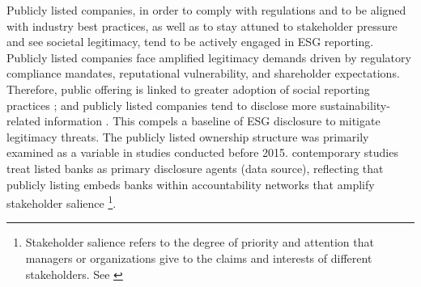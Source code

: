 \documentclass[
  authoryear]{elsarticle}
\begin{document}
Publicly listed companies, in order to comply with regulations and to be
aligned with industry best practices, as well as to stay attuned to
stakeholder pressure and see societal legitimacy, tend to be actively
engaged in ESG reporting. Publicly listed companies face amplified
legitimacy demands driven by regulatory compliance mandates,
reputational vulnerability, and shareholder expectations. Therefore,
public offering is linked to greater adoption of social reporting
practices \citep{HADDOCK2005}; and publicly listed companies tend to
disclose more sustainability-related information
\citep{GAMERSCHLAG2011}. This compels a baseline of ESG disclosure to
mitigate legitimacy threats. The publicly listed ownership structure was
primarily examined as a variable in studies conducted before 2015.
contemporary studies
\citep[e.g.][]{SAHASRANAMAM2020, AMEEN2022, ALOBAID2024} treat listed
banks as primary disclosure agents (data source), reflecting that
publicly listing embeds banks within accountability networks that
amplify stakeholder salience \footnote{Stakeholder salience refers to
  the degree of priority and attention that managers or organizations
  give to the claims and interests of different stakeholders. See
  \citet{MITCHELL1997}}.
\end{document}
